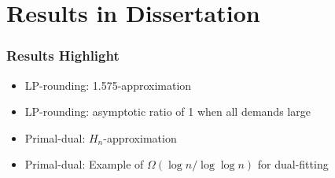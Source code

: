 \documentclass[hyperref,dvipsnames,svgnames,compress]{beamer}
\begin{document}
\section[Results]{Results in Dissertation}
\begin{frame}
  \frametitle{Results Highlight}
  \large{
  \begin{itemize}
    \addtolength{\itemsep}{1\baselineskip}
  \item \color{blue}LP-rounding: 1.575-approximation
  \item \color{blue}LP-rounding: asymptotic ratio of 1 when all demands large
  \item \color{blue}Primal-dual: $H_n$-approximation
  \item \color{blue}Primal-dual: Example of $\Omega(\log n / \log\log n)$ for dual-fitting
  \end{itemize}}
\end{frame}
\end{document}
